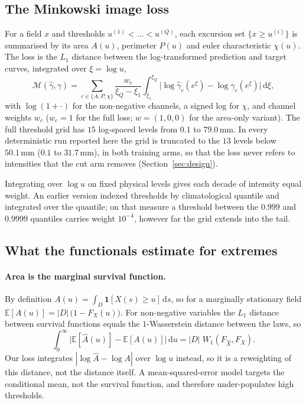 \documentclass{article}
\begin{document}
\subsection{The Minkowski image loss}
\label{sec:loss}
For a field $x$ and thresholds $u^{(1)} < \dots < u^{(Q)}$, each excursion set $\{x \ge u^{(i)}\}$ is summarised by its
area $A(u)$, perimeter $P(u)$ and euler characteristic $\chi(u)$. The loss is the $L_1$ distance between the
log-transformed prediction and target curves, integrated over $\xi = \log u$,
\begin{equation}
  \mathcal{M}(\hat{\gamma}, \gamma)
  = \sum_{c \in \{A,P,\chi\}} \frac{w_c}{\xi_Q - \xi_1} \int_{\xi_1}^{\xi_Q}
    \bigl| \log \hat{\gamma}_c(e^{\xi}) - \log \gamma_c(e^{\xi}) \bigr| \, \mathrm{d}\xi ,
  \label{eq:mink}
\end{equation}
with $\log(1+\cdot)$ for the non-negative channels, a signed log for $\chi$, and channel weights $w_c$ ($w_c = 1$ for
the full loss; $w = (1,0,0)$ for the area-only variant). The full threshold grid has $15$ log-spaced levels from $0.1$
to $79.0\,\mathrm{mm}$. In every deterministic run reported here the grid is truncated to the $13$ levels below
$50.1\,\mathrm{mm}$ ($0.1$ to $31.7\,\mathrm{mm}$), in both training arms, so that the loss never refers to
intensities that the cut arm removes (Section~\ref{sec:design}).

Integrating over $\log u$ on fixed physical levels gives each decade of intensity equal weight. An earlier version
indexed thresholds by climatological quantile and integrated over the quantile; on that measure a threshold between
the $0.999$ and $0.9999$ quantiles carries weight $10^{-4}$, however far the grid extends into the tail.

\subsection{What the functionals estimate for extremes}
\label{sec:theory}
\paragraph{Area is the marginal survival function.} By definition $A(u) = \int_D \mathbf{1}[X(s) \ge u]\,\mathrm{d}s$,
so for a marginally stationary field $\mathbb{E}[A(u)] = |D|\,\bigl(1 - F_X(u)\bigr)$. For non-negative variables the
$L_1$ distance between survival functions equals the $1$-Wasserstein distance between the laws, so
\begin{equation}
  \int_0^\infty \bigl| \mathbb{E}[\hat{A}(u)] - \mathbb{E}[A(u)] \bigr| \,\mathrm{d}u
  = |D| \; W_1\!\left(F_{\hat{X}}, F_X\right) .
  \label{eq:w1}
\end{equation}
Our loss integrates $|\log \hat{A} - \log A|$ over $\log u$ instead, so it is a reweighting of this distance, not the
distance itself. A mean-squared-error model targets the conditional mean, not the survival function, and therefore
under-populates high thresholds.
\end{document}
